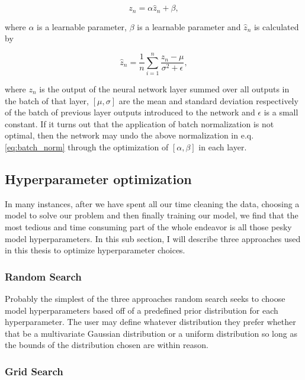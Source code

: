 \begin{equation}
    z_n = \alpha \hat{z}_n + \beta,
\end{equation}{}

where $\alpha$ is a learnable parameter, $\beta$ is a learnable parameter and $\hat{z}_n$ is calculated by 

\begin{equation}\label{eq:batch_norm}
    \hat{z}_n = \frac{1}{n} \sum_{i=1}^{n} \frac{z_n - \mu}{\sigma^{2} + \epsilon},
\end{equation}{}

where $z_n$ is the output of the neural network layer summed over all outputs in the batch of that layer, $[\mu,\sigma]$ are the mean and standard deviation respectively of the batch of previous layer outputs introduced to the network and $\epsilon$ is a small constant. If it turns out that the application of batch normalization is not optimal, then the network may undo the above normalization in e.q. \ref{eq:batch_norm} through the optimization of $[\alpha,\beta]$ in each layer.

\subsection{Hyperparameter optimization}

In many instances, after we have spent all our time cleaning the data, 
choosing a model to solve our problem and then finally 
training our model, we find that the most tedious and 
time consuming part of the whole endeavor is all those 
pesky model hyperparameters. In this sub section, I will 
describe three approaches used in this thesis to optimize 
hyperparameter choices.

\subsubsection{Random Search}
Probably the simplest of the three approaches random search 
seeks to choose model hyperparameters based off of a 
predefined prior distribution for each hyperparameter. 
The user may define whatever distribution they prefer 
whether that be a multivariate Gaussian distribution 
or a uniform distribution so long as the bounds of the 
distribution chosen are within reason.

\subsubsection{Grid Search}

